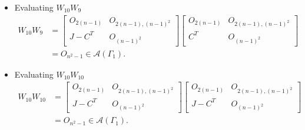 \begin{itemize}
    \item Evaluating $W_{10}W_9$
    \begin{align*}
        W_{10}W_9
        &=\begin{bmatrix}
            O_{2(n-1)} & O_{2(n-1), (n-1)^2} \\
            J-C^T & O_{(n-1)^2}
        \end{bmatrix}\begin{bmatrix}
            O_{2(n-1)} & O_{2(n-1), (n-1)^2} \\
            C^T & O_{(n-1)^2}
        \end{bmatrix}\\
        &= O_{n^2-1}\in\mathcal{A}(\Gamma_1).
    \end{align*}
    \item Evaluating $W_{10}W_{10}$
    \begin{align*}
        W_{10}W_{10}
        &=\begin{bmatrix}
            O_{2(n-1)} & O_{2(n-1), (n-1)^2} \\
            J-C^T & O_{(n-1)^2}
        \end{bmatrix}\begin{bmatrix}
            O_{2(n-1)} & O_{2(n-1), (n-1)^2} \\
            J-C^T & O_{(n-1)^2}
        \end{bmatrix}\\
        &= O_{n^2-1}\in\mathcal{A}(\Gamma_1).
    \end{align*}
\end{itemize}


